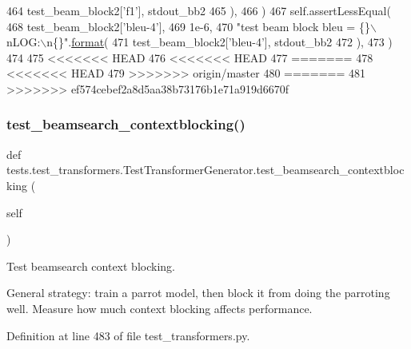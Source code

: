 \begin{DoxyCode}
464                 test\_beam\_block2[\textcolor{stringliteral}{'f1'}], stdout\_bb2
465             ),
466         )
467         self.assertLessEqual(
468             test\_beam\_block2[\textcolor{stringliteral}{'bleu-4'}],
469             1e-6,
470             \textcolor{stringliteral}{"test beam block bleu = \{\}\(\backslash\)nLOG:\(\backslash\)n\{\}"}.\hyperlink{namespaceparlai_1_1chat__service_1_1services_1_1messenger_1_1shared__utils_a32e2e2022b824fbaf80c747160b52a76}{format}(
471                 test\_beam\_block2[\textcolor{stringliteral}{'bleu-4'}], stdout\_bb2
472             ),
473         )
474 
475 <<<<<<< HEAD
476 <<<<<<< HEAD
477 =======
478 <<<<<<< HEAD
479 >>>>>>> origin/master
480 =======
481 >>>>>>> ef574cebef2a8d5aa38b73176b1e71a919d6670f
\end{DoxyCode}
\mbox{\label{classtests_1_1test__transformers_1_1TestTransformerGenerator_a582830b5de9edfa1b6077988067f9143}} 
\subsubsection{\texorpdfstring{test\+\_\+beamsearch\+\_\+contextblocking()}{test\_beamsearch\_contextblocking()}}
{\footnotesize\ttfamily def tests.\+test\+\_\+transformers.\+Test\+Transformer\+Generator.\+test\+\_\+beamsearch\+\_\+contextblocking (\begin{DoxyParamCaption}\item[{}]{self }\end{DoxyParamCaption})}

\begin{DoxyVerb}Test beamsearch context blocking.

General strategy: train a parrot model, then block it from doing the parroting
well. Measure how much context blocking affects performance.
\end{DoxyVerb}
 

Definition at line 483 of file test\+\_\+transformers.\+py.


